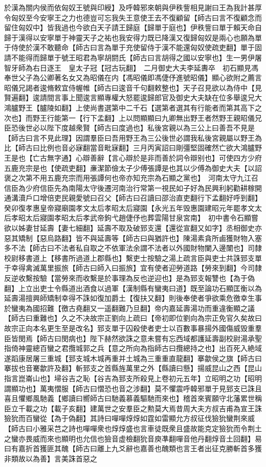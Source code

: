 於漢為關内侯而依匈奴王號與印綬】及呼韓邪來朝與伊秩訾相見謝曰王為我計甚厚令匈奴至今安寧王之力也德豈可忘我失王意使王去不復顧留【師古曰言不復顧念而留住匈奴中】皆我過也今欲白天子請王歸庭【歸單于庭也】伊秩訾曰單于賴天命自歸于漢得以安寧單于神靈天子之祐也我安得力既已降漢又復歸匈奴是兩心也願為單于侍使於漢不敢聽命【師古曰言為單于充使留侍于漢不能還匈奴使疏吏翻】單于固請不能得而歸單于號王昭君為寧胡閼氏【師古曰言胡得之國以安寧也】生一男伊屠智牙師為右日逐王　皇太子冠【冠古玩翻】　二月御史大夫李延夀卒　初石顯見馮奉世父子為公卿著名女又為昭儀在内【馮昭儀即馮倢伃進號昭儀】顯心欲附之薦言昭儀兄謁者逡脩敕宜侍幄帷【師古曰逡音千句翻敕整也】天子召見欲以為侍中【見賢遍翻】逡請間言事上聞逡言顯專權大怒罷逡歸郎官及御史大夫缺在位多舉逡兄大鴻臚野王【臚陵如翻】上使尚書選第中二千石【選第者選其有行能者而第其高下之次也】而野王行能第一【行下孟翻】上以問顯顯曰九卿無出野王者然野王親昭儀兄臣恐後世必以陛下度越衆賢【師古曰度過也】私後宮親以為三公上曰善吾不見是【師古曰言不見此理】因謂羣臣曰吾用野王為三公後世必謂我私後宮親屬以野王為比【師古曰比例也音必寐翻當音毗寐翻】三月丙寅詔曰剛彊堅固確然亡欲大鴻臚野王是也【亡古無字通】心辯善辭【言心辯於是非而善於詞令辯别也】可使四方少府五鹿充宗是也【使疏吏翻】亷潔節儉太子少傅張譚是也其以少傅為御史大夫【以詔褒之次第不用五鹿充宗而用張譚何也帝亦知充宗為石顯之黨也】　河南太守九江召信臣為少府信臣先為南陽太守後遷河南治行常第一視民如子好為民興利躬勸耕稼開通溝瀆戶口增倍吏民親愛號曰召父【師古曰召讀曰邵治直吏翻行下孟翻好呼到翻】　癸卯復孝惠皇帝寢廟園孝文太后孝昭太后寢園【永光五年毁惠園建昭元年罷孝文太后孝昭太后寢園孝昭太后孝武帝鉤弋趙倢伃也葬雲陽甘泉宮南】　初中書令石顯嘗欲以姊妻甘延壽【妻七細翻】延壽不取及破郅支還【還從宣翻又如字】丞相御史亦惡其矯制【惡烏路翻】皆不與延壽等【師古曰與猶許也】陳湯素貪所鹵獲財物入塞多不法【師古曰不法者私自取之不依軍法余謂不法者以外國財物闌入邊闈也】司隸校尉移書道上【移書所過道上郡縣也】繫吏士按驗之湯上疏言臣與吏士共誅郅支單于幸得禽滅萬里振旅【師古曰師入曰振旅】宜有使者迎勞道路【勞來到翻】今司隸反逆收繫按驗【當勞來而收繫是於事理為反也逆迎也】是為郅支報讐也【為于偽翻】上立出吏士令縣道出酒食以過軍【漢制縣有蠻夷曰道】既至論功石顯匡衡以為延壽湯擅興師矯制幸得不誅如復加爵土【復扶又翻】則後奉使者爭欲乘危徼幸生事於蠻夷為國招難【徼古堯翻又一遥翻難乃旦翻】帝内嘉延壽湯功而重違衡顯之議【師古曰重難也】久之不决故宗正劉向上疏曰【帝初即位劉向為宗正免官久矣故曰故宗正向本名更生至是改名】郅支單于囚殺使者吏士以百數事暴揚外國傷威毁重羣臣皆閔焉【師古曰閔病也】陛下赫然欲誅之意未嘗有忘西域都護延壽副校尉湯承聖指倚神靈總百蠻之君攬城郭之兵【意之所向為指師古曰攬總持之也】出百死入絶域遂蹈康居屠三重城【郅支城木城再重并土城為三重重直龍翻】搴歙侯之旗【師古曰搴拔也音騫歙許及翻】斬郅支之首縣旌萬里之外【縣讀曰懸】揚威昆山之西【昆山指言崑崙山也】埽谷吉之恥【谷吉為郅支所殺見上卷初元五年】立昭明之功【昭明謂顯功也】萬夷慴服【師古曰慴恐也音之涉翻】莫不懼震呼韓邪單于見郅支已誅且喜且懼鄉風馳義【鄉讀曰嚮師古曰馳義慕義驅馳而來也】稽首來賓願守北藩累世稱臣立千載之功【載子亥翻】建萬世之安羣臣之勲莫大焉昔周大夫方叔吉甫為宣王誅獫狁而百蠻從【為于偽翻】其詩曰嘽嘽焞焞如霆如雷顯允方叔征伐獫狁蠻荆來威【師古曰小雅采芑之詩也嘽嘽衆也焞焞盛也言車徒既衆且盛故能克定獫狁而令荆土之蠻亦畏威而來也顯明也允信也獫音虚檢翻狁音庾凖翻嘽音他丹翻焞音土回翻】易曰有嘉折首獲匪其醜【師古曰離上九爻辭也嘉善也醜類也言王者出征克勝斬首多獲非類故以為善】言美誅首惡之